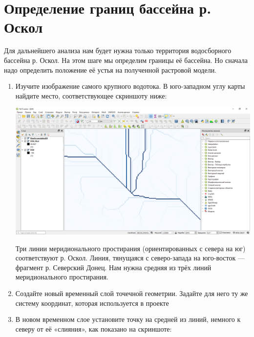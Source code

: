 \documentclass[
  12pt,
]{book}
\begin{document}
\hypertarget{hydrodem-basin}{%
\section{Определение границ бассейна р. Оскол}\label{hydrodem-basin}}

Для дальнейшего анализа нам будет нужна только территория водосборного бассейна р. Оскол. На этом шаге мы определим границы её бассейна. Но сначала надо определить положение её устья на полученной растровой модели.

\begin{enumerate}
\def\labelenumi{\arabic{enumi}.}
\item
  Изучите изображение самого крупного водотока. В юго-западном углу карты найдите место, соответствующее скриншоту ниже:

  \includegraphics{images/Ex13/oskol_mouth.png}

  Три линии меридионального простирания (ориентированных с севера на юг) соответствуют р. Оскол. Линия, тянущаяся с северо-запада на юго-восток --- фрагмент р. Северский Донец. Нам нужна средняя из трёх линий меридионального простирания.
\item
  Создайте новый временный слой точечной геометрии. Задайте для него ту же систему координат, которая используется в проекте
\item
  В новом временном слое установите точку на средней из линий, немного к северу от её «слияния», как показано на скриншоте:


\end{enumerate}
\end{document}
